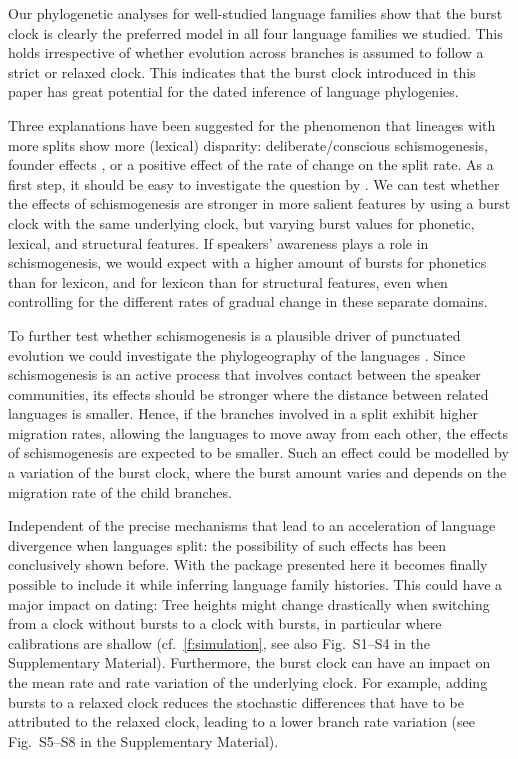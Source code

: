\documentclass[]{rsos}%
\begin{document}
Our phylogenetic analyses for well-studied language families show that the
burst clock is clearly the preferred model in all four language families we
studied. This holds irrespective of whether evolution across branches is assumed
to follow a strict or relaxed clock.
This indicates that the burst clock introduced in this paper has great potential for
the dated inference of language phylogenies.

Three
explanations have been suggested for the phenomenon that lineages with more
splits show more (lexical) disparity: deliberate/conscious schismogenesis,
founder effects \parencite{atkinson2008languages,greenhill2017evolutionary},
or a positive effect of the rate of change on the split rate.
As a first step, it should be easy to investigate the question by
\textcite{gray2013three}. We can test whether the effects of schismogenesis are stronger in more salient features by using a burst clock with the same underlying clock, but varying burst values for phonetic, lexical, and structural features.
If speakers' awareness plays a role in schismogenesis, we would expect with
\citeauthor{gray2013three} a higher amount of bursts for phonetics than for
lexicon, and for lexicon than for structural features, even when controlling for
the different rates of gradual change in these separate domains.

To further test whether schismogenesis is a plausible driver of punctuated evolution we could investigate the phylogeography of the languages \parencite{neureiter2021can}.
Since schismogenesis is an active process that involves contact between the speaker communities, its effects should be stronger
where the distance between related languages is smaller. Hence, if the branches involved in a split exhibit higher migration rates, allowing the languages to move away from each other, the effects of schismogenesis are expected to be smaller. Such an effect could be modelled by a variation of the burst clock, where the burst amount varies and depends on the migration rate of the child branches.

Independent of the precise mechanisms that lead to an acceleration of language divergence when languages split: the possibility of such effects has been conclusively shown before. With the package presented here it becomes finally possible to include it while inferring language family histories. This could have a major impact on dating: Tree heights might change drastically when switching from a clock without bursts to a clock with bursts, in particular where calibrations are shallow (cf.\ \cref{f:simulation}, see also Fig.\ S1--S4 in the Supplementary Material). Furthermore, the burst clock can have an impact on the mean rate and rate variation of the underlying clock.
For example, adding bursts to a relaxed clock reduces the stochastic differences that have to be attributed to the relaxed clock, leading to a lower branch rate variation (see Fig.\ S5--S8 in the Supplementary Material).
\end{document}
